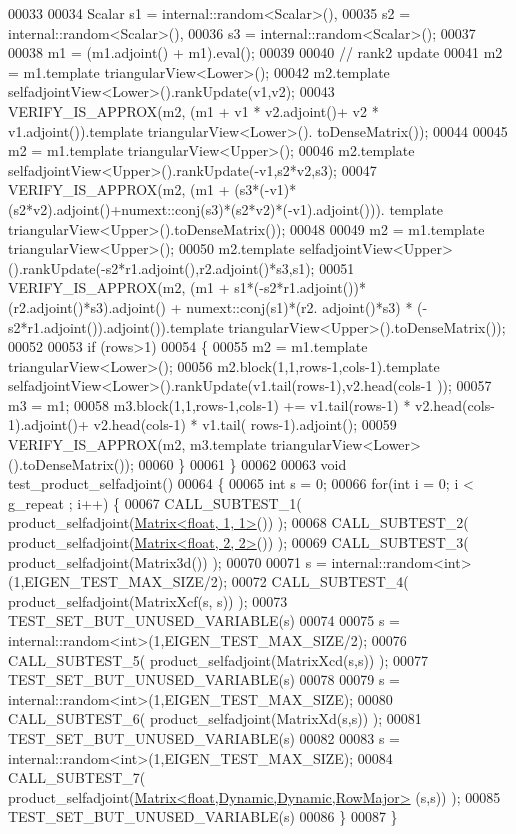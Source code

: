 \begin{DoxyCode}
00033 
00034   Scalar s1 = internal::random<Scalar>(),
00035          s2 = internal::random<Scalar>(),
00036          s3 = internal::random<Scalar>();
00037 
00038   m1 = (m1.adjoint() + m1).eval();
00039 
00040   \textcolor{comment}{// rank2 update}
00041   m2 = m1.template triangularView<Lower>();
00042   m2.template selfadjointView<Lower>().rankUpdate(v1,v2);
00043   VERIFY\_IS\_APPROX(m2, (m1 + v1 * v2.adjoint()+ v2 * v1.adjoint()).\textcolor{keyword}{template} triangularView<Lower>().
      toDenseMatrix());
00044 
00045   m2 = m1.template triangularView<Upper>();
00046   m2.template selfadjointView<Upper>().rankUpdate(-v1,s2*v2,s3);
00047   VERIFY\_IS\_APPROX(m2, (m1 + (s3*(-v1)*(s2*v2).adjoint()+numext::conj(s3)*(s2*v2)*(-v1).adjoint())).\textcolor{keyword}{
      template} triangularView<Upper>().toDenseMatrix());
00048 
00049   m2 = m1.template triangularView<Upper>();
00050   m2.template selfadjointView<Upper>().rankUpdate(-s2*r1.adjoint(),r2.adjoint()*s3,s1);
00051   VERIFY\_IS\_APPROX(m2, (m1 + s1*(-s2*r1.adjoint())*(r2.adjoint()*s3).adjoint() + numext::conj(s1)*(r2.
      adjoint()*s3) * (-s2*r1.adjoint()).adjoint()).\textcolor{keyword}{template} triangularView<Upper>().toDenseMatrix());
00052 
00053   \textcolor{keywordflow}{if} (rows>1)
00054   \{
00055     m2 = m1.template triangularView<Lower>();
00056     m2.block(1,1,rows-1,cols-1).template selfadjointView<Lower>().rankUpdate(v1.tail(rows-1),v2.head(cols-1
      ));
00057     m3 = m1;
00058     m3.block(1,1,rows-1,cols-1) += v1.tail(rows-1) * v2.head(cols-1).adjoint()+ v2.head(cols-1) * v1.tail(
      rows-1).adjoint();
00059     VERIFY\_IS\_APPROX(m2, m3.template triangularView<Lower>().toDenseMatrix());
00060   \}
00061 \}
00062 
00063 \textcolor{keywordtype}{void} test\_product\_selfadjoint()
00064 \{
00065   \textcolor{keywordtype}{int} s = 0;
00066   \textcolor{keywordflow}{for}(\textcolor{keywordtype}{int} i = 0; i < g\_repeat ; i++) \{
00067     CALL\_SUBTEST\_1( product\_selfadjoint(\hyperlink{group___core___module_class_eigen_1_1_matrix}{Matrix<float, 1, 1>}()) );
00068     CALL\_SUBTEST\_2( product\_selfadjoint(\hyperlink{group___core___module_class_eigen_1_1_matrix}{Matrix<float, 2, 2>}()) );
00069     CALL\_SUBTEST\_3( product\_selfadjoint(Matrix3d()) );
00070     
00071     s = internal::random<int>(1,EIGEN\_TEST\_MAX\_SIZE/2);
00072     CALL\_SUBTEST\_4( product\_selfadjoint(MatrixXcf(s, s)) );
00073     TEST\_SET\_BUT\_UNUSED\_VARIABLE(s)
00074     
00075     s = internal::random<int>(1,EIGEN\_TEST\_MAX\_SIZE/2);
00076     CALL\_SUBTEST\_5( product\_selfadjoint(MatrixXcd(s,s)) );
00077     TEST\_SET\_BUT\_UNUSED\_VARIABLE(s)
00078     
00079     s = internal::random<int>(1,EIGEN\_TEST\_MAX\_SIZE);
00080     CALL\_SUBTEST\_6( product\_selfadjoint(MatrixXd(s,s)) );
00081     TEST\_SET\_BUT\_UNUSED\_VARIABLE(s)
00082     
00083     s = internal::random<int>(1,EIGEN\_TEST\_MAX\_SIZE);
00084     CALL\_SUBTEST\_7( product\_selfadjoint(\hyperlink{group___core___module_class_eigen_1_1_matrix}{Matrix<float,Dynamic,Dynamic,RowMajor>}
      (s,s)) );
00085     TEST\_SET\_BUT\_UNUSED\_VARIABLE(s)
00086   \}
00087 \}
\end{DoxyCode}
